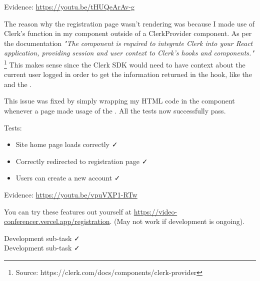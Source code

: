 {\sffamily Evidence: \url{https://youtu.be/tHUQeArAv-g}}

{\color{gray} \hrulefill}
\vspace{0.2cm}

The reason why the registration page wasn't rendering was because
I made use of Clerk's  function in my 
 component outside of a ClerkProvider component.
As per the documentation \textit{"The} 
 \textit{component is required to integrate
Clerk into your React application, providing session and user
context to Clerk's hooks and components."} 
\footnote{Source: https://clerk.com/docs/components/clerk-provider}
This makes sense since
the Clerk SDK would need to have context about the current user
logged in order to get the information returned in the
 hook, like the  and the 
. \\ \vspace{0.2cm}

This issue was fixed by simply wrapping my HTML code in the 
 component whenever a page made usage of the
. All the tests now successfully pass. \\ \vspace{0.2cm}

{\sffamily Tests:}
\begin{itemize}
  \item Site home page loads correctly \faCheck \\
  \item Correctly redirected to registration page \faCheck \\
  \item Users can create a new account \faCheck \\
\end{itemize}

{\sffamily Evidence: \url{https://youtu.be/vpuVXP1-RTw}}

{\color{gray} \hrulefill}
\vspace{0.2cm}

You can try these features out yourself at \url{https://video-conferencer.vercel.app/registration}.
(May not work if development is ongoing).\\ \vspace{0.2cm}

{\sffamily Development sub-task  \faCheck \\ \vspace{0.2cm}
Development sub-task  \faCheck } \\ \vspace{0.2cm}

